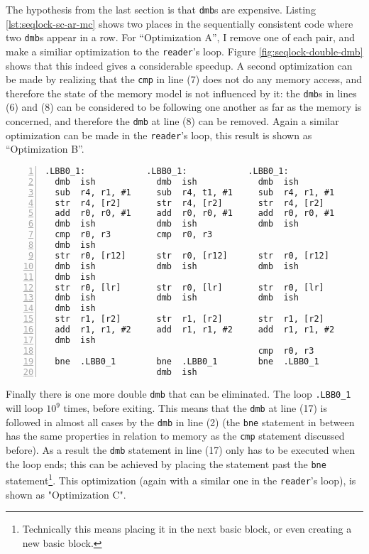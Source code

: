 \documentclass[journal]{IEEEtran}
\begin{document}
The hypothesis from the last section is that \texttt{dmb}s are expensive.
Listing \ref{lst:seqlock-sc-ar-mc} shows two places in the sequentially consistent code where two \texttt{dmb}s appear in a row.
For ``Optimization A'', I remove one of each pair, and make a similiar optimization to the \texttt{reader}'s loop.
Figure \ref{fig:seqlock-double-dmb} shows that this indeed gives a considerable speedup.
A second optimization can be made by realizing that the \texttt{cmp} in line (7) does not do any memory access, and therefore the state of the memory model is not influenced by it: the \texttt{dmb}s in lines (6) and (8) can be considered to be following one another as far as the memory is concerned, and therefore the \texttt{dmb} at line (8) can be removed.
Again a similar optimization can be made in the \texttt{reader}'s loop, this result is shown as ``Optimization B''.

\begin{figure*}[t]
    \begin{lstlisting}[caption={Loop of the \texttt{writer} function of the seqlock algorithm, left the sequentially consistent version, right the acquire/release version, in the middle the version with the double \texttt{dmb}s removed by hand (Optimization C)},frame=single,xleftmargin=2em,numbers=left,label=lst:seqlock-sc-opt-ar-mc]
.LBB0_1:            .LBB0_1:            .LBB0_1:                         
  dmb  ish            dmb  ish            dmb  ish
  sub  r4, r1, #1     sub  r4, t1, #1     sub  r4, r1, #1
  str  r4, [r2]       str  r4, [r2]       str  r4, [r2]
  add  r0, r0, #1     add  r0, r0, #1     add  r0, r0, #1
  dmb  ish            dmb  ish            dmb  ish
  cmp  r0, r3         cmp  r0, r3
  dmb  ish          
  str  r0, [r12]      str  r0, [r12]      str  r0, [r12]
  dmb  ish            dmb  ish            dmb  ish
  dmb  ish          
  str  r0, [lr]       str  r0, [lr]       str  r0, [lr]
  dmb  ish            dmb  ish            dmb  ish
  dmb  ish          
  str  r1, [r2]       str  r1, [r2]       str  r1, [r2]
  add  r1, r1, #2     add  r1, r1, #2     add  r1, r1, #2
  dmb  ish
                                          cmp  r0, r3
  bne  .LBB0_1        bne  .LBB0_1        bne  .LBB0_1
                      dmb  ish
    \end{lstlisting}
\end{figure*}

Finally there is one more double \texttt{dmb} that can be eliminated.
The loop \texttt{.LBB0\_1} will loop \(10^9\) times, before exiting.
This means that the \texttt{dmb} at line (17) is followed in almost all cases by the \texttt{dmb} in line (2) (the \texttt{bne} statement in between has the same properties in relation to memory as the \texttt{cmp} statement discussed before).
As a result the \texttt{dmb} statement in line (17) only has to be executed when the loop ends; this can be achieved by placing the statement past the \texttt{bne} statement\footnote{Technically this means placing it in the next basic block, or even creating a new basic block.}.
This optimization (again with a similar one in the \texttt{reader}'s loop), is shown as "Optimization C".
\end{document}
